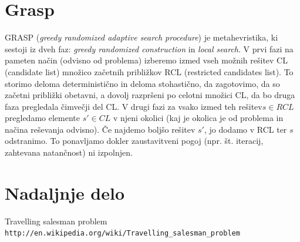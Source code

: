 \documentclass[12pt,a4paper]{amsart}
\theoremstyle{definition} %
\theoremstyle{plain} %
\begin{document}
\section{Grasp} 

GRASP (\textit{greedy randomized adaptive search procedure}) je metahevristika, ki sestoji iz dveh faz: \textit{greedy randomized construction} in \textit{local search}.
V prvi fazi na pameten način (odvisno od problema) izberemo izmed vseh možnih rešitev CL (candidate list) množico začetnih približkov RCL (restricted candidates list). 
To storimo deloma deterministično in deloma stohastično, da zagotovimo, da so začetni približki obetavni, a dovolj razpršeni po celotni množici CL, da bo druga faza pregledala čimvečji del CL. 
V drugi fazi za vsako izmed teh rešitev$ s \in  RCL $ pregledamo elemente $s' \in CL$ v njeni okolici (kaj je okolica je od problema in načina reševanja odvisno). Če najdemo boljšo rešitev $s'$, 
jo dodamo v RCL ter $s$ odstranimo. To ponavljamo dokler zaustavitveni pogoj (npr. št. iteracij, zahtevana natančnost) ni izpolnjen.

\section{Nadaljnje delo}

 

\pagebreak
\begin{thebibliography}{99}

Travelling salesman problem
\\\texttt{http://en.wikipedia.org/wiki/Travelling\_salesman\_problem}


\end{thebibliography}
\end{document}
